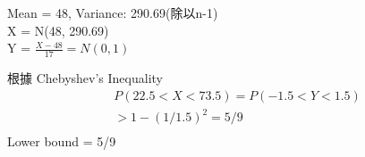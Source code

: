 \documentclass{article}
\begin{document}
\fontsize{15pt}{20pt}\selectfont

\begin{CJK}{UTF8}{bsmi} %
\noindent

Mean = 48, Variance: 290.69(除以n-1)\\
X = N(48, 290.69)\\
Y = $\frac{X-48}{17} = N(0,1)$


根據 Chebyshev’s Inequality
\begin{align*}
& P(22.5 < X < 73.5) = P(-1.5 < Y < 1.5)\\
& > 1-(1/1.5)^{2} = 5/9\\
\end{align*}
Lower bound = 5/9
\end{CJK} %
\end{document}
